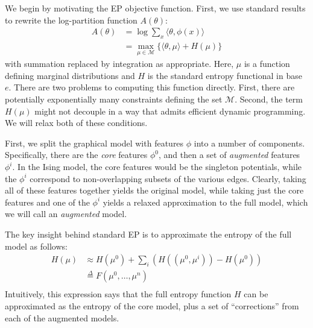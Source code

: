 \documentclass[times, 10pt,twocolumn]{article}
\begin{document}
We begin by motivating the EP objective function. First, we use standard results to rewrite the log-partition
function $A(\theta)$:
\begin{equation}
  \begin{split}
     A(\theta) &= \log \sum_x \langle\theta,\phi(x)\rangle\\
     &= \max_{\mu \in \mathcal{M}} \{ \langle\theta,\mu\rangle + H(\mu) \}
   \end{split}
 \end{equation}
with summation replaced by integration as appropriate. Here, $\mu$
is a function defining marginal distributions and $H$ is the standard
entropy functional in base $e$. There are two problems to computing
this function directly. First, there are potentially exponentially
many constraints defining the set $\mathcal M$. Second, the term
$H(\mu)$ might not decouple in a way that admits efficient dynamic
programming. We will relax both of these conditions.

First, we split the graphical model with features $\phi$ into
a number of components. Specifically, there are the \textit{core}
features $\phi^0$, and then a set of \textit{augmented}
features $\phi^i$. In the Ising model, the core features would
be the singleton potentials, while the $\phi^i$ correspond to
non-overlapping subsets of the various edges. Clearly, taking all
of these features together yields the original model, while taking
just the core features and one of the $\phi^i$ yields 
a relaxed approximation to the full model, which we will call an
\textit{augmented} model.

The key insight behind standard EP is to approximate the entropy of
the full model as follows:
\begin{equation}
  \begin{split}
     H(\mu) &\approx H(\mu^0) + \sum_i \left ( H( (\mu^0,\mu^i)) -
     H(\mu^0)\right) \\
     & \stackrel{\Delta}= F(\mu^0, \ldots, \mu^n) \\
     \label{eqn:epentropy}
   \end{split}
 \end{equation}
Intuitively, this expression says that the full entropy function
$H$ can be approximated as the entropy of the core model, plus
a set of ``corrections'' from each of the augmented models.
\end{document}
